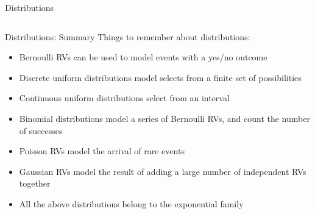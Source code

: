{\begin{frame}{Distributions}
\begin{columns}[onlytextwidth]
\begin{column}{0.5\textwidth}
            \end{column}
        \end{columns}
    \end{frame}


    \begin{frame}{Distributions: Summary}
        Things to remember about distributions:
        \begin{itemize}
            \item Bernoulli RVs can be used to model events with a yes/no outcome
            \item Discrete uniform distributions model selects from a finite set of possibilities
            \item Continuous uniform distributions select from an interval
            \item Binomial distributions model a series of Bernoulli RVs, and count the number of successes
            \item Poisson RVs model the arrival of rare events
            \item Gaussian RVs model the result of adding a large number of independent RVs together
            \item All the above distributions belong to the exponential family
        \end{itemize}
    \end{frame}

}
